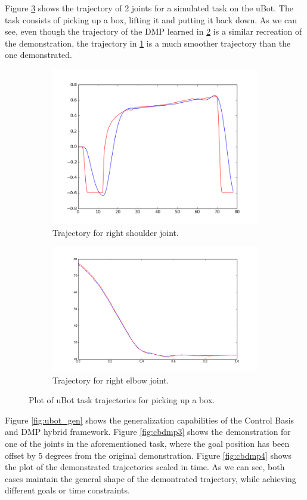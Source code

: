 \documentclass[a4paper]{article}
\begin{document}
\indent Figure \ref{fig:ubot} shows the trajectory of 2 joints for a simulated task on the uBot. The task consists of picking up a box, lifting it and putting it back down. As we can see, even though the trajectory of the DMP learned in \ref{fig:cbdmp2} is a similar recreation of the demonstration, the trajectory in \ref{fig:cbdmp1} is a much smoother trajectory than the one demonstrated. 


\begin{figure}
\centering
\begin{subfigure}{.5\textwidth}
  \centering
  \includegraphics[width=.8\linewidth]{cb_dmp1.png}
  \caption{Trajectory for right shoulder joint.}
  \label{fig:cbdmp1}
\end{subfigure}%
\begin{subfigure}{.5\textwidth}
  \centering
  \includegraphics[width=.8\linewidth]{cb_dmp2.png}
  \caption{Trajectory for right elbow joint.}
  \label{fig:cbdmp2}
\end{subfigure}
\caption{Plot of uBot task trajectories for picking up a box.}
\label{fig:ubot}
\end{figure}
 
 
Figure \ref{fig:ubot_gen} shows the generalization capabilities of the Control Basis and DMP hybrid framework. Figure \ref{fig:cbdmp3} shows the demonstration for one of the joints in the aforementioned task, where the goal position has been offset by 5 degrees from the original demonstration. Figure \ref{fig:cbdmp4} shows the plot of the demonstrated trajectories scaled in time. As we can see, both cases maintain the general shape of the demontrated trajectory, while achieving different goals or time constraints.
 
\end{document}
